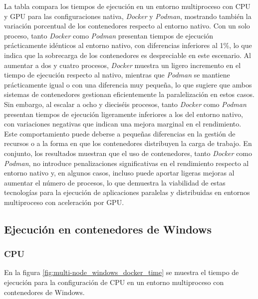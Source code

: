 La tabla compara los tiempos de ejecución en un entorno multiproceso con CPU y GPU para las configuraciones nativa, \textit{Docker} y \textit{Podman}, mostrando también la variación porcentual de los contenedores respecto al entorno nativo. Con un solo proceso, tanto \textit{Docker} como \textit{Podman} presentan tiempos de ejecución prácticamente idénticos al entorno nativo, con diferencias inferiores al 1\%, lo que indica que la sobrecarga de los contenedores es despreciable en este escenario. Al aumentar a dos y cuatro procesos, \textit{Docker} muestra un ligero incremento en el tiempo de ejecución respecto al nativo, mientras que \textit{Podman} se mantiene prácticamente igual o con una diferencia muy pequeña, lo que sugiere que ambos sistemas de contenedores gestionan eficientemente la paralelización en estos casos. Sin embargo, al escalar a ocho y dieciséis procesos, tanto \textit{Docker} como \textit{Podman} presentan tiempos de ejecución ligeramente inferiores a los del entorno nativo, con variaciones negativas que indican una mejora marginal en el rendimiento. Este comportamiento puede deberse a pequeñas diferencias en la gestión de recursos o a la forma en que los contenedores distribuyen la carga de trabajo. En conjunto, los resultados muestran que el uso de contenedores, tanto \textit{Docker} como \textit{Podman}, no introduce penalizaciones significativas en el rendimiento respecto al entorno nativo y, en algunos casos, incluso puede aportar ligeras mejoras al aumentar el número de procesos, lo que demuestra la viabilidad de estas tecnologías para la ejecución de aplicaciones paralelas y distribuidas en entornos multiproceso con aceleración por GPU.

\subsection{Ejecución en contenedores de Windows}
\subsubsection{CPU}

En la figura \ref{fig:multi-node_windows_docker_time} se muestra el tiempo de ejecución para la configuración de CPU en un entorno multiproceso con contenedores de Windows.

